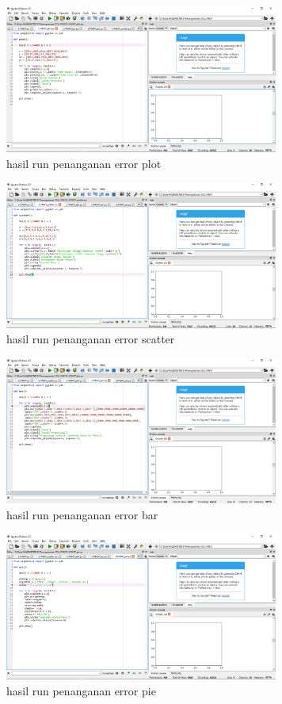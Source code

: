 		\begin{figure}[H]
			\includegraphics[width=9cm]{figures/chapter6/1174057/error1.png}
			\centering
			\centering
			\caption{hasil run penanganan error plot}
		\end{figure}
		\begin{figure}[H]
			\includegraphics[width=9cm]{figures/chapter6/1174057/error2.png}
			\centering
			\centering
			\caption{hasil run penanganan error scatter}
		\end{figure}
		\begin{figure}[H]
			\includegraphics[width=9cm]{figures/chapter6/1174057/error3.png}
			\centering
			\centering
			\caption{hasil run penanganan error bar}
		\end{figure}
		\begin{figure}[H]
			\includegraphics[width=9cm]{figures/chapter6/1174057/error4.png}
			\centering
			\centering
			\caption{hasil run penanganan error pie}
		\end{figure}
		
